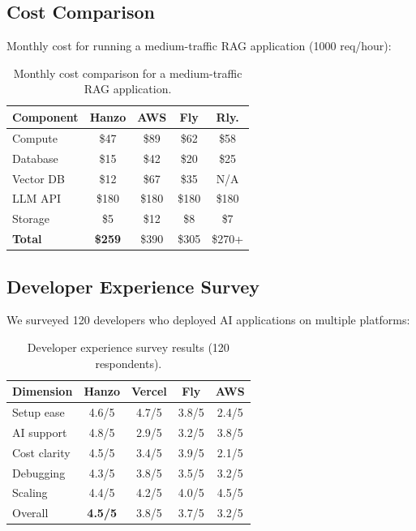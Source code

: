 \documentclass[11pt,twocolumn]{article}
\begin{document}
\subsection{Cost Comparison}

Monthly cost for running a medium-traffic RAG application (1000 req/hour):

\begin{table}[H]
\centering
\small
\begin{tabular}{lcccc}
\toprule
\textbf{Component} & \textbf{Hanzo} & \textbf{AWS} & \textbf{Fly} & \textbf{Rly.} \\
\midrule
Compute & \$47 & \$89 & \$62 & \$58 \\
Database & \$15 & \$42 & \$20 & \$25 \\
Vector DB & \$12 & \$67 & \$35 & N/A \\
LLM API & \$180 & \$180 & \$180 & \$180 \\
Storage & \$5 & \$12 & \$8 & \$7 \\
\midrule
\textbf{Total} & \textbf{\$259} & \$390 & \$305 & \$270+ \\
\bottomrule
\end{tabular}
\caption{Monthly cost comparison for a medium-traffic RAG application.}
\label{tab:cost}
\end{table}

\subsection{Developer Experience Survey}

We surveyed 120 developers who deployed AI applications on multiple platforms:

\begin{table}[H]
\centering
\small
\begin{tabular}{lcccc}
\toprule
\textbf{Dimension} & \textbf{Hanzo} & \textbf{Vercel} & \textbf{Fly} & \textbf{AWS} \\
\midrule
Setup ease & 4.6/5 & 4.7/5 & 3.8/5 & 2.4/5 \\
AI support & 4.8/5 & 2.9/5 & 3.2/5 & 3.8/5 \\
Cost clarity & 4.5/5 & 3.4/5 & 3.9/5 & 2.1/5 \\
Debugging & 4.3/5 & 3.8/5 & 3.5/5 & 3.2/5 \\
Scaling & 4.4/5 & 4.2/5 & 4.0/5 & 4.5/5 \\
Overall & \textbf{4.5/5} & 3.8/5 & 3.7/5 & 3.2/5 \\
\bottomrule
\end{tabular}
\caption{Developer experience survey results (120 respondents).}
\label{tab:dx_survey}
\end{table}
\end{document}
